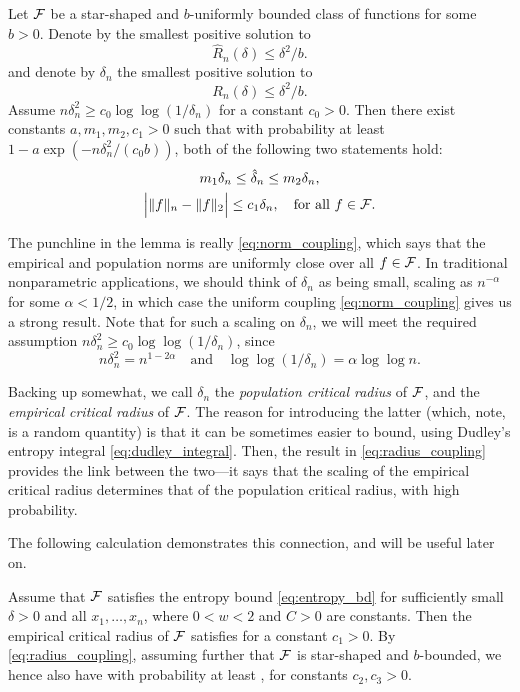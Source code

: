 \documentclass{article}
\begin{document}
\begin{lemma}  
\label{lem:norm_coupling}
Let $\mathcal{F}$ be a star-shaped and $b$-uniformly bounded class of functions for some 
$b>0$. Denote by  the smallest positive solution to 
\[
\hat{R}_n(\delta) \leq \delta^2 / b.
\]
and denote by $\delta_n$ the smallest positive solution to
\[
R_n(\delta) \leq \delta^2 / b.
\]
Assume $n\delta_n^2 \geq c_0 \log\log(1/\delta_n)$ for a constant $c_0>0$. 
Then there exist constants $a,m_1,m_2,c_1>0$ such that with probability at
least $1 - a \exp(-n \delta_n^2 / (c_0 b))$, both of the following two
statements hold:
\begin{gather}
\label{eq:radius_coupling}
m_1 \delta_n \leq \hat\delta_n \leq m_2 \delta_n, \\
\label{eq:norm_coupling}
\Big| \|f\|_n - \|f\|_2 \Big| \leq c_1 \delta_n, \quad \text{for all $f \in
  \mathcal{F}$}. 
\end{gather}
\end{lemma}

The punchline in the lemma is really \eqref{eq:norm_coupling}, which says that
the empirical and population norms are uniformly close over all $f \in
\mathcal{F}$. In traditional nonparametric applications, we should think of $\delta_n$
as being small, scaling as $n^{-\alpha}$ for some $\alpha <  1/2$, in which case
the uniform coupling \eqref{eq:norm_coupling} gives us a strong result. Note
that for such a scaling on $\delta_n$, we will meet the required assumption
$n\delta_n^2 \geq c_0 \log\log(1/\delta_n)$, since   
\[
n\delta_n^2 = n^{1-2\alpha} \quad \text{and} \quad\log\log(1/\delta_n) = \alpha
\log\log n.
\]

Backing up somewhat, we call $\delta_n$ the \emph{population critical radius} of
$\mathcal{F}$, and  the \emph{empirical critical radius} of
$\mathcal{F}$. The reason for introducing the latter (which, note, is a random quantity)
is that it can be sometimes easier to bound, using Dudley's entropy integral
\eqref{eq:dudley_integral}. Then, the result in \eqref{eq:radius_coupling}
provides the link between the two---it says that the scaling of the empirical
critical radius determines that of the population critical radius, with high
probability.    

The following calculation demonstrates this connection, and will be useful later
on.

\begin{lemma}
\label{lem:critical_rad}
Assume that $\mathcal{F}$ satisfies the entropy bound \eqref{eq:entropy_bd} for
sufficiently small $\delta>0$ and all $x_1,\dots,x_n$, where $0<w<2$ and $C>0$
are constants. Then the empirical critical radius of $\mathcal{F}$ satisfies
 for a constant $c_1>0$. By
\eqref{eq:radius_coupling}, assuming further that $\mathcal{F}$ is star-shaped and
$b$-bounded, we hence also have  with
probability at least , for constants
$c_2,c_3>0$.      
\end{lemma}
\end{document}
